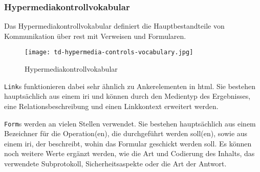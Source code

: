 \subsubsection{Hypermediakontrollvokabular}

Das Hypermediakontrollvokabular definiert die Hauptbestandteile von Kommunikation über \gls{rest} mit Verweisen und Formularen.

\begin{figure}[H]
  \centering
  \texttt{[image: td-hypermedia-controls-vocabulary.jpg]}
  \caption{ Hypermediakontrollvokabular}\label{fig:td_hypermedia_controls_vocabulary}
\end{figure}

\lstinline{Link}s funktionieren dabei sehr ähnlich zu Ankerelementen in \gls{html}. Sie bestehen hauptsächlich aus einem \gls{iri} und können durch den Medientyp des Ergebnisses, eine Relationsbeschreibung und einen Linkkontext erweitert werden.

\lstinline{Form}s werden an vielen Stellen verwendet. Sie bestehen hauptsächlich aus einem Bezeichner für die Operation(en), die durchgeführt werden soll(en), sowie aus einem \gls{iri}, der beschreibt, wohin das Formular geschickt werden soll. Es können noch weitere Werte ergänzt werden, wie die Art und Codierung des Inhalts, das verwendete Subprotokoll, Sicherheitsaspekte oder die Art der Antwort.
